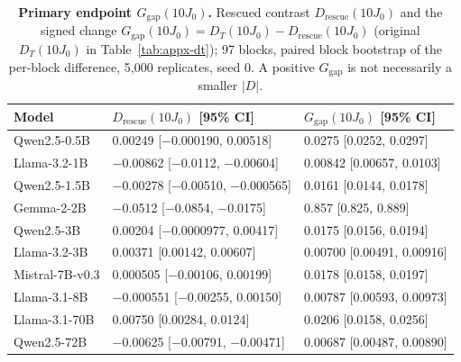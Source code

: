 \begin{table}[!htbp]
\centering
\scriptsize
\caption{\textbf{Primary endpoint \(G_{\mathrm{gap}}(10J_0)\).}  Rescued contrast \(D_{\mathrm{rescue}}(10J_0)\) and the signed change \(G_{\mathrm{gap}}(10J_0)=D_T(10J_0)-D_{\mathrm{rescue}}(10J_0)\) (original \(D_T(10J_0)\) in Table~\ref{tab:appx-dt}); 97 blocks, paired block bootstrap of the per-block difference, 5,000 replicates, seed 0.  A positive \(G_{\mathrm{gap}}\) is not necessarily a smaller \(|D|\).}
\label{tab:appx-ggap}
\begin{tabular}{@{}lll@{}}
\toprule
Model & \(D_{\mathrm{rescue}}(10J_0)\) [95\% CI] & \(G_{\mathrm{gap}}(10J_0)\) [95\% CI] \\
\midrule
Qwen2.5-0.5B & 0.00249 [$-$0.000190, 0.00518] & 0.0275 [0.0252, 0.0297] \\
Llama-3.2-1B & $-$0.00862 [$-$0.0112, $-$0.00604] & 0.00842 [0.00657, 0.0103] \\
Qwen2.5-1.5B & $-$0.00278 [$-$0.00510, $-$0.000565] & 0.0161 [0.0144, 0.0178] \\
Gemma-2-2B & $-$0.0512 [$-$0.0854, $-$0.0175] & 0.857 [0.825, 0.889] \\
Qwen2.5-3B & 0.00204 [$-$0.0000977, 0.00417] & 0.0175 [0.0156, 0.0194] \\
Llama-3.2-3B & 0.00371 [0.00142, 0.00607] & 0.00700 [0.00491, 0.00916] \\
Mistral-7B-v0.3 & 0.000505 [$-$0.00106, 0.00199] & 0.0178 [0.0158, 0.0197] \\
Llama-3.1-8B & $-$0.000551 [$-$0.00255, 0.00150] & 0.00787 [0.00593, 0.00973] \\
Llama-3.1-70B & 0.00750 [0.00284, 0.0124] & 0.0206 [0.0158, 0.0256] \\
Qwen2.5-72B & $-$0.00625 [$-$0.00791, $-$0.00471] & 0.00687 [0.00487, 0.00890] \\
\bottomrule
\end{tabular}
\end{table}
